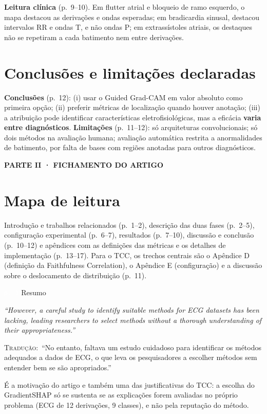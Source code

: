 \documentclass[11pt,a4paper]{article}
\newcommand{\pagechip}[1]{{\setlength{\fboxsep}{1.5pt}\colorbox{cAcc}{\textcolor{white}{\scriptsize\texttt{#1}}}}}
\newcommand{\partbar}[1]{\par\vspace{1.2em}\noindent\colorbox{black!80}{\parbox{\dimexpr\linewidth-2\fboxsep}{\color{white}\bfseries\sffamily\MakeUppercase{#1}}}\par\vspace{0.4em}}
\newenvironment{origquote}{\par\itshape\small}{\par}
\newenvironment{tradquote}{\par\small\textsc{Tradução:}\ }{\par}
\newcommand{\explab}[1]{\par\smallskip{\small\color{cAcc}\textbf{\MakeUppercase{#1}}}\par}
\begin{document}
\textbf{Leitura clínica} (p.~9--10). Em flutter atrial e bloqueio de ramo esquerdo, o mapa destacou as derivações e ondas esperadas; em bradicardia sinusal, destacou intervalos RR e ondas T, e não ondas P; em extrassístoles atriais, os destaques não se repetiram a cada batimento nem entre derivações.

\section{Conclusões e limitações declaradas}
\textbf{Conclusões} (p.~12): (i) usar o Guided Grad-CAM em valor absoluto como primeira opção; (ii) preferir métricas de localização quando houver anotação; (iii) a atribuição pode identificar características eletrofisiológicas, mas a eficácia \textbf{varia entre diagnósticos}. \textbf{Limitações} (p.~11--12): só arquiteturas convolucionais; só dois métodos na avaliação humana; avaliação automática restrita a anormalidades de batimento, por falta de bases com regiões anotadas para outros diagnósticos.

\partbar{Parte II · Fichamento do artigo}

\section{Mapa de leitura}
Introdução e trabalhos relacionados (p.~1--2), descrição das duas fases (p.~2--5), configuração experimental (p.~6--7), resultados (p.~7--10), discussão e conclusão (p.~10--12) e apêndices com as definições das métricas e os detalhes de implementação (p.~13--17). Para o TCC, os trechos centrais são o Apêndice D (definição da Faithfulness Correlation), o Apêndice E (configuração) e a discussão sobre o deslocamento de distribuição (p.~11).

\begin{citacard}{\pagechip{p. 1} Resumo}
\begin{origquote}“However, a careful study to identify suitable methods for ECG datasets has been lacking, leading researchers to select methods without a thorough understanding of their appropriateness.”\end{origquote}
\begin{tradquote}“No entanto, faltava um estudo cuidadoso para identificar os métodos adequados a dados de ECG, o que leva os pesquisadores a escolher métodos sem entender bem se são apropriados.”\end{tradquote}
\explab{Explicação}
É a motivação do artigo e também uma das justificativas do TCC: a escolha do GradientSHAP só se sustenta se as explicações forem avaliadas no próprio problema (ECG de 12 derivações, 9 classes), e não pela reputação do método.
\end{citacard}
\end{document}
